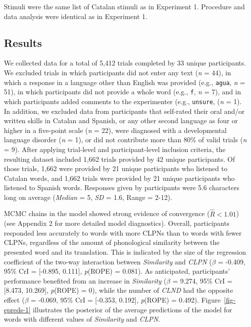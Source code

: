 \documentclass[
]{article}
\begin{document}
Stimuli were the same list of Catalan stimuli as in Experiment 1.
Procedure and data analysis were identical as in Experiment 1.

\subsection{Results}\label{results-1}

We collected data for a total of 5,412 trials completed by 33 unique
participants. We excluded trials in which participants did not enter any
text (\emph{n} = 44), in which a response in a language other than
English was provided (e.g., \texttt{agua}, \emph{n} = 51), in which
participants did not provide a whole word (e.g., \texttt{f}, \emph{n} =
7), and in which participants added comments to the experimenter (e.g.,
\texttt{unsure}, (\emph{n} = 1). In addition, we excluded data from
participants that self-rated their oral and/or written skills in Catalan
and Spanish, or any other second language as four or higher in a
five-point scale (\emph{n} = 22), were diagnosed with a developmental
language disorder (\emph{n} = 1), or did not contribute more than 80\%
of valid trials (\emph{n} = 9). After applying trial-level and
participant-level inclusion criteria, the resulting dataset included
1,662 trials provided by 42 unique participants. Of those trials, 1,662
were provided by 21 unique participants who listened to Catalan words,
and 1,662 trials were provided by 21 unique participants who listened to
Spanish words. Responses given by participants were 5.6 characters long
on average (\emph{Median} = 5, \emph{SD} = 1.6, Range = 2-12).

MCMC chains in the model showed strong evidence of convergence
(\(\hat{R}<1.01\)) (see Appendix 2 for more detailed model diagnostics).
Overall, participants responded less accurately to words with more CLPNs
than to words with fewer CLPNs, regardless of the amount of phonological
similarity between the presented word and its translation. This is
indicated by the size of the regression coefficient of the two-way
interaction between \emph{Similarity} and \emph{CLPN} (\(\beta\) =
-0.409, 95\% CrI = {[}-0.895, 0.111{]}, \emph{p}(ROPE) = 0.081). As
anticipated, participants' performance benefited from an increase in
\emph{Similarity} (\(\beta\) = 9.274, 95\% CrI = {[}8.473, 10.269{]},
\emph{p}(ROPE) = 0), while the number of \emph{CLND} had the opposite
effect (\(\beta\) = -0.069, 95\% CrI = {[}-0.353, 0.192{]},
\emph{p}(ROPE) = 0.492). Figure~\ref{fig-epreds-1} illustrates the
posterior of the average predictions of the model for words with
different values of \emph{Similarity} and \emph{CLPN}.
\end{document}
